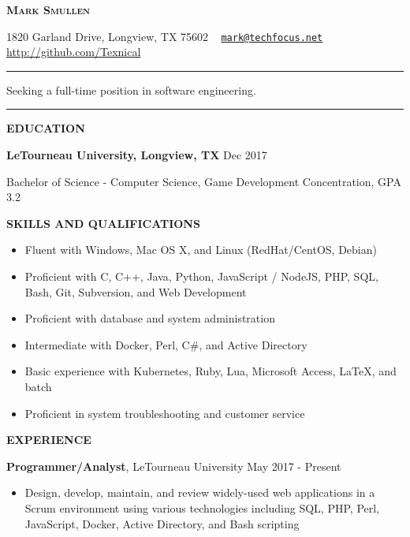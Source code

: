 \documentclass[letterpaper]{article}
\newcommand{\titlename}[1]{\centerline{\huge \bfseries{\scshape{#1}}}}
\newcommand{\contactinfo}[1]{\centerline{\small #1}}
\renewcommand{\section}[1]{\bigskip\noindent\textbf{#1}\smallskip}
\newcommand{\entry}[3]{\textbf{#1}, #2\begin{itemize}[leftmargin=3.5em]#3\end{itemize}\bigskip}
\begin{document}
\titlename{Mark Smullen}
\contactinfo{%
    1820 Garland Drive, Longview, TX 75602 \textperiodcentered \ %
    \href{mailto:mark@techfocus.net}{\nolinkurl{mark@techfocus.net}} \textperiodcentered \ %
    \url{http://github.com/Texnical} \textperiodcentered \ %
    \phonenumber[country=US]{2707911770}%
}
\vspace{2mm}
\hrule
\vspace{2mm}
\centerline{Seeking a full-time position in software engineering.}
\vspace{2mm}
\hrule

\section{EDUCATION}

\textbf{LeTourneau University, Longview, TX}                            \hfill          Dec 2017

Bachelor of Science - Computer Science, Game Development Concentration, GPA 3.2


\section{SKILLS AND QUALIFICATIONS}

\begin{multicols}{2}
\begin{itemize}[leftmargin=3.5em]
    \item Fluent with Windows, Mac OS X, and Linux (RedHat/CentOS, Debian)
    \item Proficient with C, C++, Java, Python, JavaScript / NodeJS, PHP, SQL, Bash, Git, Subversion, and Web Development
    \item Proficient with database and system administration
    \item Intermediate with Docker, Perl, C\#, and Active Directory
    \item Basic experience with Kubernetes, Ruby, Lua, Microsoft Access, \LaTeX{}, and batch
    \item Proficient in system troubleshooting and customer service
\end{itemize}
\end{multicols}

\section{EXPERIENCE}

\entry{Programmer/Analyst}{LeTourneau University                 \hfill          May 2017 - Present} {
    \item Design, develop, maintain, and review widely-used web applications in a Scrum environment using various technologies including SQL, PHP, Perl, JavaScript, Docker, Active Directory, and Bash scripting
}
\end{document}
